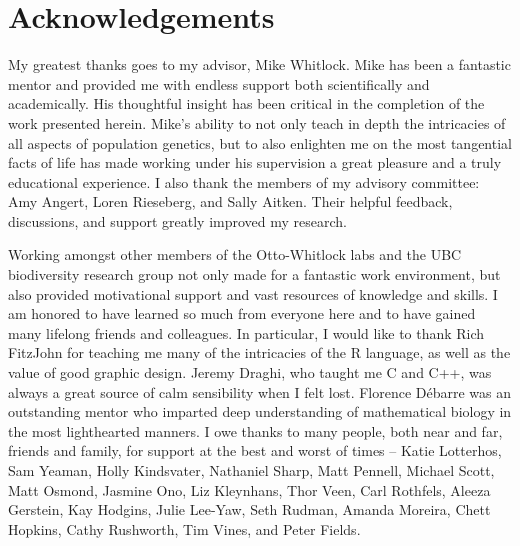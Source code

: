 \chapter*{Acknowledgements}

My greatest thanks goes to my advisor, Mike Whitlock. Mike has been a fantastic mentor and provided me with endless support both scientifically and academically. His thoughtful insight has been critical in the completion of the work presented herein. Mike's ability to not only teach in depth the intricacies of all aspects of population genetics, but to also enlighten me on the most tangential facts of life has made working under his supervision a great pleasure and a truly educational experience. I also thank the members of my advisory committee: Amy Angert, Loren Rieseberg, and Sally Aitken. Their helpful feedback, discussions, and support greatly improved my research.

Working amongst other members of the Otto-Whitlock labs and the UBC biodiversity research group not only made for a fantastic work environment, but also provided motivational support and vast resources of knowledge and skills. I am honored to have learned so much from everyone here and to have gained many lifelong friends and colleagues. In particular, I would like to thank Rich FitzJohn for teaching me many of the intricacies of the R language, as well as the value of good graphic design. Jeremy Draghi, who taught me C and C++, was always a great source of calm sensibility when I felt lost. Florence D\'ebarre was an outstanding mentor who imparted deep understanding of mathematical biology in the most lighthearted manners. I owe thanks to many people, both near and far, friends and family, for support at the best and worst of times -- Katie Lotterhos, Sam Yeaman, Holly Kindsvater, Nathaniel Sharp, Matt Pennell, Michael Scott, Matt Osmond, Jasmine Ono, Liz Kleynhans, Thor Veen, Carl Rothfels, Aleeza Gerstein, Kay Hodgins, Julie Lee-Yaw, Seth Rudman, Amanda Moreira, Chett Hopkins, Cathy Rushworth, Tim Vines, and Peter Fields.

